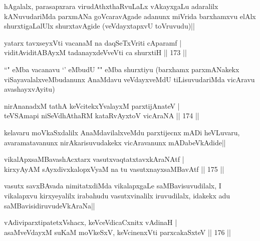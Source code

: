 \begin{artha}
hAgalalx, parasapxrara virudAthxthaRvuLaLx vAkayxgaLu adaralilx kANuvudariMda parxmANa goVcaravAgade adanunx miVrida barxhamxvu elAlx shurxtigaLalUlx shurxtavAgide (veVdayxtapxvU toVruvudu)||
\end{artha}

\begin{shl}
yatarx tavxseyxVti vacanaM na daqSeTxVriti cAparamf |\\
viditAviditABAyxM tadanayxdeVveVti ca shurxtiH \hfill || 173 ||
\end{shl}

\begin{artha}
``\stext " eMba vacanavu `\stext ' eMbudU "\stext " eMba shurxtiyu (barxhamx parxmANakekx viSayavalalxveMbudanunx AnaMdavu veVdayxveMdU tiLisuvudariMda vicAravu avashayxvAyitu)
\end{artha}

\begin{shl}
nirAnanadxM tathA keVcitekxYvalayxM parxtijAnateV |\\
teVSAmapi niSeVdhAthaRM kataRvAyx\s toV vicAraNA \hfill || 174 ||
\end{shl}

\begin{artha}
kelavaru moVkaSxdalilx AnaMdavilalxveMdu parxtijecnx mADi heVLuvaru, avaramatavanunx nirAkarisuvudakekx vicAravanunx mADabeVkAdide||
\end{artha}


\begin{shl}
vikalApxsaMBavashAcxtarx vasutxvaqtatxtavxkAraNAtf |\\
kirxyAyAM sAyxdivxkalopxV\s yaM na tu vasutxnayxsaMBavAtf \hfill || 175 ||
\end{shl}

\begin{artha}%
vasutx savxBAvada nimitatxdiMda vikalapxgaLe saMBavisuvudilalx, I vikalapxvu kirxyeyalilx irabahudu vasutxvinalilx iruvudilalx, idakekx adu saMBavisidiruvudeVkAraNa||
\end{artha}


\begin{shl}
vAdiviparxtipatetxVshacx, keVceVdicaCxnitx vAdinaH |\\
asaMveVdayxM suKaM moVkeSxV, keVcinenxVti parxcakaSxteV \hfill || 176 ||
\end{shl}

